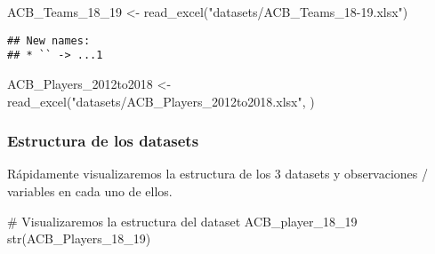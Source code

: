 \documentclass[]{article}
\newenvironment{Shaded}{\begin{snugshade}}{\end{snugshade}}
\newcommand{\KeywordTok}[1]{\textcolor[rgb]{0.94,0.87,0.69}{#1}}
\newcommand{\DecValTok}[1]{\textcolor[rgb]{0.86,0.86,0.80}{#1}}
\newcommand{\StringTok}[1]{\textcolor[rgb]{0.80,0.58,0.58}{#1}}
\newcommand{\CommentTok}[1]{\textcolor[rgb]{0.50,0.62,0.50}{#1}}
\newcommand{\NormalTok}[1]{\textcolor[rgb]{0.80,0.80,0.80}{#1}}
\begin{document}
\begin{Shaded}
\begin{Highlighting}[]
\NormalTok{ACB_Teams_18_}\DecValTok{19}\NormalTok{ <-}\StringTok{ }\KeywordTok{read_excel}\NormalTok{(}\StringTok{"datasets/ACB_Teams_18-19.xlsx"}\NormalTok{)}
\end{Highlighting}
\end{Shaded}

\begin{verbatim}
## New names:
## * `` -> ...1
\end{verbatim}

\begin{Shaded}
\begin{Highlighting}[]
\NormalTok{ACB_Players_2012to2018 <-}\StringTok{ }\KeywordTok{read_excel}\NormalTok{(}\StringTok{"datasets/ACB_Players_2012to2018.xlsx"}\NormalTok{, )}
\end{Highlighting}
\end{Shaded}

\subsubsection{Estructura de los
datasets}\label{estructura-de-los-datasets}

Rápidamente visualizaremos la estructura de los 3 datasets y
observaciones / variables en cada uno de ellos.

\begin{Shaded}
\begin{Highlighting}[]
\CommentTok{# Visualizaremos la estructura del dataset ACB_player_18_19}
\KeywordTok{str}\NormalTok{(ACB_Players_18_}\DecValTok{19}\NormalTok{)}
\end{Highlighting}
\end{Shaded}
\end{document}

